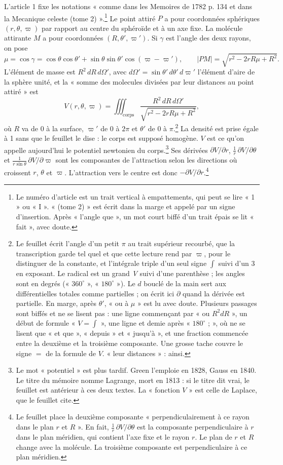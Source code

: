 \documentclass[11pt,a4paper]{article}
\begin{document}
L'article 1 fixe les notations « comme dans les Memoires de 1782 p. 134 et dans
la Mecanique celeste (tome 2) ».\footnote{Le numéro d'article est un trait
vertical à empattements, qui peut se lire « 1 » ou « I ». « (tome 2) » est écrit
dans la marge et appelé par un signe d'insertion. Après « l'angle que », un mot
court biffé d'un trait épais se lit « fait », avec doute.} Le point attiré \(P\) a pour coordonnées
sphériques \((r,\theta,\varpi)\) par rapport au centre du sphéroïde et à un axe
fixe. La molécule attirante \(M\) a pour coordonnées \((R,\theta',\varpi')\).
Si \(\gamma\) est l'angle des deux rayons, on pose
\[
\mu=\cos\gamma=\cos\theta\cos\theta'+\sin\theta\sin\theta'\cos(\varpi-\varpi'),
\qquad |PM|=\sqrt{r^2-2rR\mu+R^2}.
\]
L'élément de masse est \(R^2\,dR\,d\Omega'\), avec
\(d\Omega'=\sin\theta'\,d\theta'\,d\varpi'\) l'élément d'aire de la sphère
unité, et la « somme des molecules divisées par leur distances au point
attiré » est
\[
V(r,\theta,\varpi)=\iiint_{\text{corps}}\frac{R^2\,dR\,d\Omega'}{\sqrt{r^2-2rR\mu+R^2}},
\]
où \(R\) va de \(0\) à la surface, \(\varpi'\) de \(0\) à \(2\pi\) et \(\theta'\)
de \(0\) à \(\pi\).\footnote{Le feuillet écrit l'angle d'un petit \(\pi\)
au trait supérieur recourbé, que la transcription garde tel quel et que cette
lecture rend par \(\varpi\), pour le distinguer de la constante, et l'intégrale triple d'un seul signe \(\int\)
suivi d'un 3 en exposant. Le radical est un grand \emph{V} suivi d'une
parenthèse ; les angles sont en degrés (« \(360^\circ\) », « \(180^\circ\) »).
Le \(d\) bouclé de la main sert aux différentielles totales comme partielles ;
on écrit ici \(\partial\) quand la dérivée est partielle. En marge, après
\(\theta'\), « ou à \(\mu\) » est lu avec doute. Plusieurs passages sont biffés
et ne se lisent pas : une ligne commençant par « ou \(R^2dR\) », un début de
formule « \(V=\int\) », une ligne et demie après « \(180^\circ\) ; », où ne se
lisent que « et que », « depuis » et « jusqu'à », et une fraction commencée
entre la deuxième et la troisième composante. Une grosse tache couvre le signe
\(=\) de la formule de \(V\). « leur distances » : ainsi.} La densité est prise
égale à 1 sans que le feuillet le dise : le corps est supposé homogène.
\(V\) est ce qu'on appelle aujourd'hui le potentiel newtonien du
corps.\footnote{Le mot « potentiel » est plus tardif. Green l'emploie en 1828,
Gauss en 1840. Le titre du mémoire nomme Lagrange, mort en 1813 : si le titre
dit vrai, le feuillet est antérieur à ces deux textes. La « fonction \(V\) »
est celle de Laplace, que le feuillet cite.} Ses dérivées
\(\partial V/\partial r\), \(\frac1r\,\partial V/\partial\theta\) et
\(\frac{1}{r\sin\theta}\,\partial V/\partial\varpi\) sont les composantes de
l'attraction selon les directions où croissent \(r\), \(\theta\) et \(\varpi\).
L'attraction vers le centre est donc \(-\partial V/\partial r\).\footnote{Le
feuillet place la deuxième composante « perpendiculairement à ce rayon dans le
plan \(r\) et \(R\) ». En fait, \(\frac1r\,\partial V/\partial\theta\) est la
composante perpendiculaire à \(r\) dans le plan méridien, qui contient l'axe
fixe et le rayon \(r\). Le plan de \(r\) et \(R\) change avec la molécule. La
troisième composante est perpendiculaire à ce plan méridien.}
\end{document}
